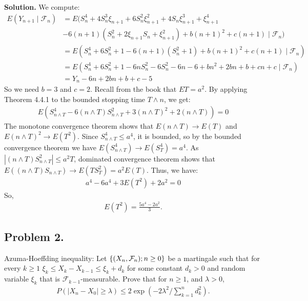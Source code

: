 \documentclass[12pt]{article}
\theoremstyle{definitionstyle}
\newcommand{\SET}[1]{\Set{\mskip-\medmuskip #1 \mskip-\medmuskip}}
\newcommand{\1}{\mathds 1}
\begin{document}
    \textbf{Solution.}
    We compute:
    \begin{align*}
        E(Y_{n+1} \mid \mathcal F_n) &= E(S_n^4 + 4S_n^3\xi_{n+1} + 6S_n^2\xi_{n+1}^2 + 4S_n\xi_{n+1}^3 + \xi_{n+1}^4 
        \\ &- 6(n+1)(S_n^2 + 2\xi_{n+1}S_n + \xi_{n+1}^2) + b(n+1)^2 + c(n+1) \mid \mathcal F_n) \\
        &= E(S_n^4 + 6S_n^2 + 1 - 6(n+1)(S_n^2 + 1) + b(n+1)^2 + c(n+1) \mid \mathcal F_n) \\
        &= E(S_n^4 + 6S_n^2 + 1 - 6nS_n^2 - 6S_n^2 - 6n - 6 + bn^2 + 2bn + b + cn + c \mid \mathcal F_n) \\
        &= Y_n - 6n + 2bn + b + c -5
    \end{align*}
    So we need $b = 3$ and $c = 2$. Recall from the book that $ET = a^2$. By applying Theorem 4.4.1 to the bounded stopping time $T \land n$, we get:
    \begin{align*}
        E(S_{n \land T}^4 - 6(n \land T) S_{n \land T}^2 + 3(n \land T)^2 + 2(n \land T)) = 0
    \end{align*}
    The monotone convergence theorem shows that $E(n \land T) \to E(T)$ and $E(n \land T)^2 \to E(T^2)$. Since $S_{n \land T}^4 \leq a^4$, it is bounded, so by the bounded convergence theorem we have $E(S_{n \land T}^4) \to E(S_T^4) = a^4$. As $|(n \land T)S_{n \land T}^2| \leq a^2T$, dominated convergence theorem shows that $E((n \land T)S_{n \land T}) \to E(TS_T^2) = a^2E(T)$. Thus, we have:
    \begin{align*}
        a^4 - 6a^4 + 3E(T^2) + 2a^2 = 0
    \end{align*}
    So,
    \begin{align*}
        E(T^2) = \frac{5a^4-2a^2}{3}.
    \end{align*}

    \subsection*{Problem 2.}
    Azuma-Hoeffding inequality: Let $\SET{(X_n,\mathcal F_n); n \geq 0}$ be a martingale such that for every $k \geq 1$ $\xi_k \leq X_k - X_{k-1} \leq \xi_k + d_k$ for some constant $d_k > 0$ and random variable $\xi_k$ that is $\mathcal F_{k-1}$-measurable. Prove that for $n \geq 1$, and $\lambda > 0$,
    \begin{align*}
        P(|X_n - X_0| \geq \lambda) \leq 2\exp(-2\lambda^2\bigg/\sum_{k=1}^n d_k^2).
    \end{align*}
    
\end{document}
